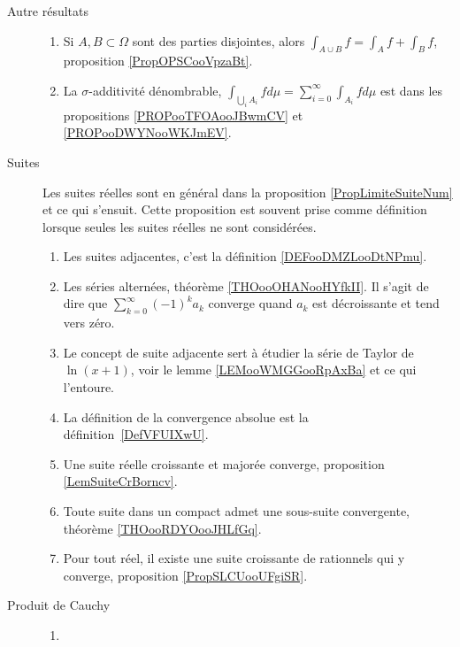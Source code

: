 \begin{description}
\item[Autre résultats]
\begin{enumerate}
    \item
        Si \( A,B\subset \Omega\) sont des parties disjointes, alors $\int_{A\cup B}f=\int_Af+\int_Bf$, proposition \ref{PropOPSCooVpzaBt}.
    \item
        La \( \sigma\)-additivité dénombrable, $\int_{\bigcup_iA_i}fd\mu=\sum_{i=0}^{\infty}\int_{A_i}fd\mu$ est dans les propositions \ref{PROPooTFOAooJBwmCV} et \ref{PROPooDWYNooWKJmEV}.
\end{enumerate}
\end{description}



\begin{description}
    \item[Suites] 
        Les suites réelles sont en général dans la proposition \ref{PropLimiteSuiteNum} et ce qui s'ensuit. Cette proposition est souvent prise comme définition lorsque seules les suites réelles ne sont considérées.
        \begin{enumerate}
    \item
        Les suites adjacentes, c'est la définition \ref{DEFooDMZLooDtNPmu}. 
    \item
        Les séries alternées, théorème \ref{THOooOHANooHYfkII}. Il s'agit de dire que \( \sum_{k=0}^{\infty}(-1)^ka_k\) converge quand \( a_k\) est décroissante et tend vers zéro.
    \item
        Le concept de suite adjacente sert à étudier la série de Taylor de \( \ln(x+1)\), voir le lemme \ref{LEMooWMGGooRpAxBa} et ce qui l'entoure.
    \item
        La définition de la convergence absolue est la définition~\ref{DefVFUIXwU}.
            \item
                Une suite réelle croissante et majorée converge, proposition \ref{LemSuiteCrBorncv}.
            \item
                Toute suite dans un compact admet une sous-suite convergente, théorème \ref{THOooRDYOooJHLfGq}.
            \item
                Pour tout réel, il existe une suite croissante de rationnels qui y converge, proposition \ref{PropSLCUooUFgiSR}.
        \end{enumerate}
    \item[Produit de Cauchy]
        \begin{enumerate}
            \item

\end{enumerate}
\end{description}
